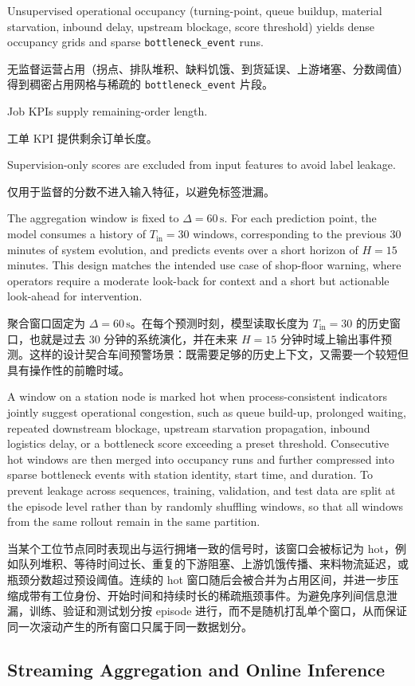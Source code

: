 \documentclass[12pt,a4paper,oneside,scheme=plain]{ctexrep}
\newcommand{\bip}[2]{%
  \par #1\par
  \nobreak\vspace{0.12em}%
  {\small\color{black!62}#2}\par
  \vspace{0.62em}%
}
\begin{document}
\bip
{Unsupervised operational occupancy (turning-point, queue buildup, material starvation, inbound delay, upstream blockage, score threshold) yields dense occupancy grids and sparse \texttt{bottleneck\_event} runs.}
{无监督运营占用（拐点、排队堆积、缺料饥饿、到货延误、上游堵塞、分数阈值）得到稠密占用网格与稀疏的 \texttt{bottleneck\_event} 片段。}

\bip
{Job KPIs supply remaining-order length.}
{工单 KPI 提供剩余订单长度。}

\bip
{Supervision-only scores are excluded from input features to avoid label leakage.}
{仅用于监督的分数不进入输入特征，以避免标签泄漏。}


\bip
{The aggregation window is fixed to $\Delta=60\,\mathrm{s}$. For each prediction point, the model consumes a history of $T_{\mathrm{in}}=30$ windows, corresponding to the previous 30 minutes of system evolution, and predicts events over a short horizon of $H=15$ minutes. This design matches the intended use case of shop-floor warning, where operators require a moderate look-back for context and a short but actionable look-ahead for intervention.}
{聚合窗口固定为 $\Delta=60\,\mathrm{s}$。在每个预测时刻，模型读取长度为 $T_{\mathrm{in}}=30$ 的历史窗口，也就是过去 30 分钟的系统演化，并在未来 $H=15$ 分钟时域上输出事件预测。这样的设计契合车间预警场景：既需要足够的历史上下文，又需要一个较短但具有操作性的前瞻时域。}

\bip
{A window on a station node is marked hot when process-consistent indicators jointly suggest operational congestion, such as queue build-up, prolonged waiting, repeated downstream blockage, upstream starvation propagation, inbound logistics delay, or a bottleneck score exceeding a preset threshold. Consecutive hot windows are then merged into occupancy runs and further compressed into sparse bottleneck events with station identity, start time, and duration. To prevent leakage across sequences, training, validation, and test data are split at the episode level rather than by randomly shuffling windows, so that all windows from the same rollout remain in the same partition.}
{当某个工位节点同时表现出与运行拥堵一致的信号时，该窗口会被标记为 hot，例如队列堆积、等待时间过长、重复的下游阻塞、上游饥饿传播、来料物流延迟，或瓶颈分数超过预设阈值。连续的 hot 窗口随后会被合并为占用区间，并进一步压缩成带有工位身份、开始时间和持续时长的稀疏瓶颈事件。为避免序列间信息泄漏，训练、验证和测试划分按 episode 进行，而不是随机打乱单个窗口，从而保证同一次滚动产生的所有窗口只属于同一数据划分。}

\subsection[Streaming Aggregation and Online Inference / 流式聚合与在线推理]{Streaming Aggregation and Online Inference}
\label{sec:online}
\end{document}
